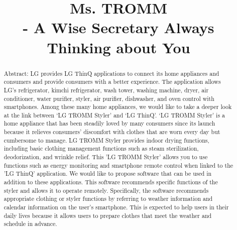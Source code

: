 \documentclass[conference]{IEEEtran}
\begin{document}
\title{Ms. TROMM \\
- A Wise Secretary Always Thinking about You\\
}

\author{
\and
{}
\and
{}
\and
{}
}

\maketitle

\begin{abstract}
Abstract: LG provides LG ThinQ applications to connect its home appliances and consumers and provide consumers with a better experience. The application allows LG's refrigerator, kimchi refrigerator, wash tower, washing machine, dryer, air conditioner, water purifier, styler, air purifier, dishwasher, and oven control with smartphones. Among these many home appliances, we would like to take a deeper look at the link between ‘LG TROMM Styler’ and ‘LG ThinQ’. ‘LG TROMM Styler’ is a home appliance that has been steadily loved by many consumers since its launch because it relieves consumers' discomfort with clothes that are worn every day but cumbersome to manage. LG TROMM Styler provides indoor drying functions, including basic clothing management functions such as steam sterilization, deodorization, and wrinkle relief. This 'LG TROMM Styler' allows you to use functions such as energy monitoring and smartphone remote control when linked to the 'LG ThinQ' application. We would like to propose software that can be used in addition to these applications. This software recommends specific functions of the styler and allows it to operate remotely. Specifically, the software recommends appropriate clothing or styler functions by referring to weather information and calendar information on the user's smartphone. This is expected to help users in their daily lives because it allows users to prepare clothes that meet the weather and schedule in advance.
\end{abstract}
\end{document}

